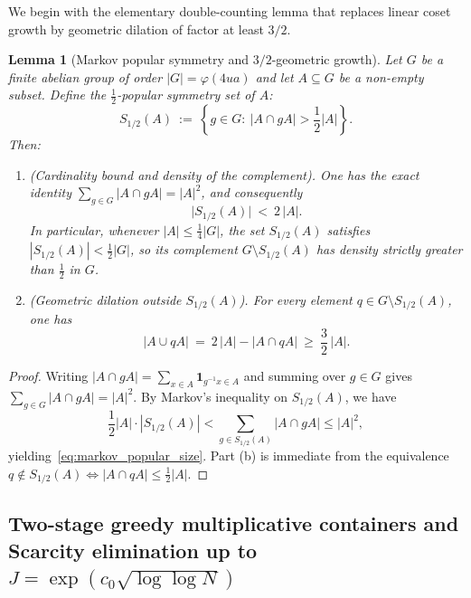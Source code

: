\documentclass[11pt, a4paper]{article}
\theoremstyle{plain}
\newtheorem{lemma}[theorem]{Lemma}
\theoremstyle{definition}
\begin{document}
We begin with the elementary double-counting lemma that replaces linear coset growth by geometric dilation of factor at least $3/2$.

\begin{lemma}[Markov popular symmetry and $3/2$-geometric growth]\label{lem:markov_popular_symmetry}
Let $G$ be a finite abelian group of order $|G|=\varphi(4ua)$ and let $A\subseteq G$ be a non-empty subset. Define the \emph{$\frac12$-popular symmetry set} of $A$:
\[
S_{1/2}(A)\ :=\ \left\{g\in G:\ \big|A\cap gA\big|>\frac12|A|\right\}.
\]
Then:
\begin{enumerate}[label=(\alph*)]
    \item \emph{(Cardinality bound and density of the complement).} One has the exact identity $\sum_{g\in G}|A\cap gA|=|A|^{2}$, and consequently
    \begin{equation}\label{eq:markov_popular_size}
    \big|S_{1/2}(A)\big|\ <\ 2\,|A|.
    \end{equation}
    In particular, whenever $|A|\le\frac14|G|$, the set $S_{1/2}(A)$ satisfies $|S_{1/2}(A)|<\frac12|G|$, so its complement $G\setminus S_{1/2}(A)$ has density strictly greater than $\frac12$ in $G$.
    
    \item \emph{(Geometric dilation outside $S_{1/2}(A)$).} For every element $q\in G\setminus S_{1/2}(A)$, one has
    \begin{equation}\label{eq:geometric_growth_32}
    \big|A\cup qA\big|\ =\ 2\,|A|-\big|A\cap qA\big|\ \ge\ \frac32\,|A|.
    \end{equation}
\end{enumerate}
\end{lemma}

\begin{proof}
Writing $|A\cap gA|=\sum_{x\in A}\mathbf{1}_{g^{-1}x\in A}$ and summing over $g\in G$ gives $\sum_{g\in G}|A\cap gA|=|A|^{2}$. By Markov's inequality on $S_{1/2}(A)$, we have 
\[
\frac12|A|\cdot|S_{1/2}(A)|<\sum_{g\in S_{1/2}(A)}|A\cap gA|\le|A|^{2},
\]
yielding~\eqref{eq:markov_popular_size}. Part (b) is immediate from the equivalence $q\notin S_{1/2}(A)\iff|A\cap qA|\le\frac12|A|$.
\end{proof}

\subsection{Two-stage greedy multiplicative containers and Scarcity elimination up to $J=\exp(c_0\sqrt{\log\log N})$}\label{subsec:greedy_containers}
\end{document}
